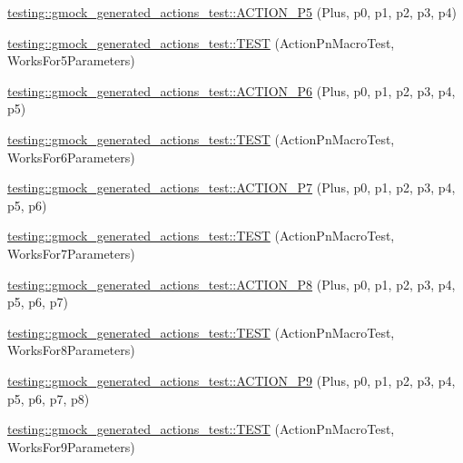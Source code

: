 \begin{DoxyCompactItemize}
\item 
\mbox{\hyperlink{namespacetesting_1_1gmock__generated__actions__test_a948863fb38d913f02a0c5bde6be0b0a0}{testing\+::gmock\+\_\+generated\+\_\+actions\+\_\+test\+::\+A\+C\+T\+I\+O\+N\+\_\+\+P5}} (Plus, p0, p1, p2, p3, p4)
\item 
\mbox{\hyperlink{namespacetesting_1_1gmock__generated__actions__test_a132cab07373e037a06807a5948b1410b}{testing\+::gmock\+\_\+generated\+\_\+actions\+\_\+test\+::\+T\+E\+ST}} (Action\+Pn\+Macro\+Test, Works\+For5\+Parameters)
\item 
\mbox{\hyperlink{namespacetesting_1_1gmock__generated__actions__test_a97cbcc90a3063a1882886ded61fc8979}{testing\+::gmock\+\_\+generated\+\_\+actions\+\_\+test\+::\+A\+C\+T\+I\+O\+N\+\_\+\+P6}} (Plus, p0, p1, p2, p3, p4, p5)
\item 
\mbox{\hyperlink{namespacetesting_1_1gmock__generated__actions__test_a9031cb5f0e3d9de21ed3ff0a98a311d4}{testing\+::gmock\+\_\+generated\+\_\+actions\+\_\+test\+::\+T\+E\+ST}} (Action\+Pn\+Macro\+Test, Works\+For6\+Parameters)
\item 
\mbox{\hyperlink{namespacetesting_1_1gmock__generated__actions__test_a58bc376a0637fc1e89e6503466d1b9cd}{testing\+::gmock\+\_\+generated\+\_\+actions\+\_\+test\+::\+A\+C\+T\+I\+O\+N\+\_\+\+P7}} (Plus, p0, p1, p2, p3, p4, p5, p6)
\item 
\mbox{\hyperlink{namespacetesting_1_1gmock__generated__actions__test_add3cba52186c7ce384808c222492ee18}{testing\+::gmock\+\_\+generated\+\_\+actions\+\_\+test\+::\+T\+E\+ST}} (Action\+Pn\+Macro\+Test, Works\+For7\+Parameters)
\item 
\mbox{\hyperlink{namespacetesting_1_1gmock__generated__actions__test_ad8766a6dbaeffbf36658d3b5f75d3b00}{testing\+::gmock\+\_\+generated\+\_\+actions\+\_\+test\+::\+A\+C\+T\+I\+O\+N\+\_\+\+P8}} (Plus, p0, p1, p2, p3, p4, p5, p6, p7)
\item 
\mbox{\hyperlink{namespacetesting_1_1gmock__generated__actions__test_a1913bedf1d5cf736e91f2be119de0d5f}{testing\+::gmock\+\_\+generated\+\_\+actions\+\_\+test\+::\+T\+E\+ST}} (Action\+Pn\+Macro\+Test, Works\+For8\+Parameters)
\item 
\mbox{\hyperlink{namespacetesting_1_1gmock__generated__actions__test_ab023ad5e95ca2c2b8845963ce7222e00}{testing\+::gmock\+\_\+generated\+\_\+actions\+\_\+test\+::\+A\+C\+T\+I\+O\+N\+\_\+\+P9}} (Plus, p0, p1, p2, p3, p4, p5, p6, p7, p8)
\item 
\mbox{\hyperlink{namespacetesting_1_1gmock__generated__actions__test_a52d6dc447a4a71524adfeb7c8f7b6a68}{testing\+::gmock\+\_\+generated\+\_\+actions\+\_\+test\+::\+T\+E\+ST}} (Action\+Pn\+Macro\+Test, Works\+For9\+Parameters)

\end{DoxyCompactItemize}
